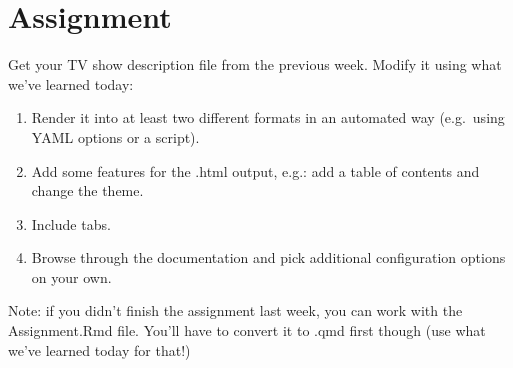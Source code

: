 \documentclass[
  letterpaper,
  DIV=11,
  numbers=noendperiod]{scrartcl}
\begin{document}
\hypertarget{assignment}{%
\section{Assignment}\label{assignment}}

Get your TV show description file from the previous week. Modify it
using what we've learned today:

\begin{enumerate}
\def\labelenumi{\arabic{enumi})}
\item
  Render it into at least two different formats in an automated way
  (e.g.~using YAML options or a script).
\item
  Add some features for the .html output, e.g.: add a table of contents
  and change the theme.
\item
  Include tabs.
\item
  Browse through the documentation and pick additional configuration
  options on your own.
\end{enumerate}

Note: if you didn't finish the assignment last week, you can work with
the Assignment.Rmd file. You'll have to convert it to .qmd first though
(use what we've learned today for that!)
\end{document}
